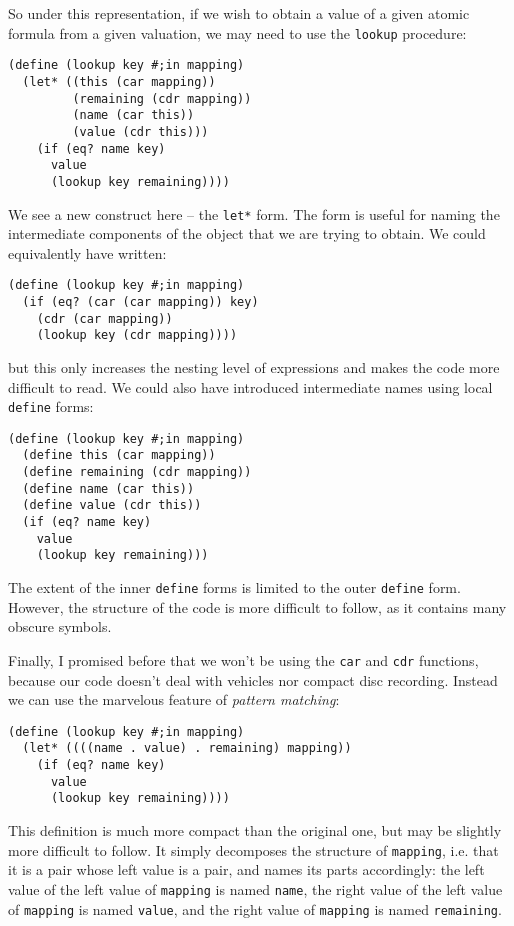 So under this representation, if we wish to obtain a value
of a given atomic formula from a given valuation, we may need
to use the \texttt{lookup} procedure:

\begin{Verbatim}[samepage=true]
(define (lookup key #;in mapping)
  (let* ((this (car mapping))
         (remaining (cdr mapping))
         (name (car this))
         (value (cdr this)))
    (if (eq? name key)
      value
      (lookup key remaining))))
\end{Verbatim}

We see a new construct here -- the \texttt{let*} form.
The form is useful for naming the intermediate components
of the object that we are trying to obtain. We could equivalently
have written:

\begin{Verbatim}[samepage=true]
(define (lookup key #;in mapping)
  (if (eq? (car (car mapping)) key)
    (cdr (car mapping))
    (lookup key (cdr mapping))))
\end{Verbatim}

but this only increases the nesting level of expressions and makes
the code more difficult to read. We could also have introduced
intermediate names using local \texttt{define} forms:

\begin{Verbatim}[samepage=true]
(define (lookup key #;in mapping)
  (define this (car mapping))
  (define remaining (cdr mapping))
  (define name (car this))
  (define value (cdr this))
  (if (eq? name key)
    value
    (lookup key remaining)))
\end{Verbatim}

The extent of the inner \texttt{define} forms is limited
to the outer \texttt{define} form. However, the structure
of the code is more difficult to follow, as it contains
many obscure symbols.

Finally, I promised before that we won't be using the
\texttt{car} and \texttt{cdr} functions, because our code
doesn't deal with vehicles nor compact disc recording. Instead
we can use the marvelous feature of \textit{pattern matching}:

\begin{Verbatim}[samepage=true]
(define (lookup key #;in mapping)
  (let* ((((name . value) . remaining) mapping))
    (if (eq? name key)
      value
      (lookup key remaining))))
\end{Verbatim}

This definition is much more compact than the original one,
but may be slightly more difficult to follow. It simply
decomposes the structure of \texttt{mapping}, i.e. that
it is a pair whose left value is a pair, and names
its parts accordingly: the left value of the left value
of \texttt{mapping} is named \texttt{name}, the right
value of the left value of \texttt{mapping} is named
\texttt{value}, and the right value of \texttt{mapping}
is named \texttt{remaining}.

